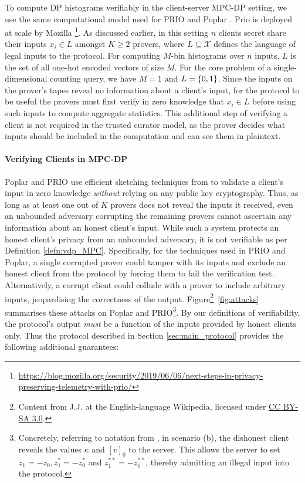 To compute DP histograms verifiably in the client-server MPC-DP setting, we use the same computational model used for PRIO \cite{corrigan-gibbs_prio_2017} and Poplar \cite{boneh_lightweight_2022}. Prio is deployed at scale by Mozilla \footnote{\url{https://blog.mozilla.org/security/2019/06/06/next-steps-in-privacy-preserving-telemetry-with-prio/}}.
As discussed earlier, in this setting $n$ clients secret share their inputs $x_i \in L$ amongst $K \geq 2$ provers, where $L \subseteq \mathcal{X}$ defines the language of legal inputs to the protocol. 
For computing $M$-bin histograms over $n$ inputs, $L$ is the set of all one-hot encoded vectors of size $M$. 
For the core problem of a single-dimensional counting query, we have $M=1$ and $L=\{ 0, 1\}$.  
Since the inputs on the prover's tapes reveal no information about a client's input, for the protocol to be useful the provers must first verify in zero knowledge that $x_i \in L$ before using such inputs to compute aggregate statistics. 
This additional step of verifying a client is not required in the trusted curator model, as the prover decides what inputs should be included in the computation and can see them in plaintext.

\paragraph{Verifying Clients in MPC-DP}
\label{sec:client_verification}

Poplar and PRIO use efficient sketching techniques from \cite{boyle_function_2016} to validate a client's input in zero knowledge \textit{without} relying on any public key cryptography. Thus, as long as at least one out of $K$ provers does not reveal the inputs it received, even an unbounded adversary corrupting the remaining provers cannot ascertain any information about an honest client's input. While such a system protects an honest client's privacy from an unbounded adversary, it is not verifiable as per Definition \ref{defn:vdp_MPC}. 
Specifically, for the techniques used in PRIO and Poplar, a single corrupted prover could tamper with its inputs and exclude an honest client from the protocol by forcing them to fail the verification test. 
Alternatively, a corrupt client could collude with a prover to include arbitrary inputs, jeopardising the correctness of the output. 
Figure\footnote{Content from J.J. at the English-language Wikipedia, licensed under \href{https://creativecommons.org/licenses/by-sa/3.0/deed.en}{CC BY-SA 3.0}.}~\ref{fig:attacks} summarises these attacks on Poplar and PRIO\footnote{Concretely, referring to  notation from \cite[Appendix C]{boneh_lightweight_2022}, in scenario (b), the dishonest client reveals the values $\kappa$ and $[v]_0$ to the server. This allows the server to set $z_1 = -z_0, z_1^* = -z_0^*$ and $z_1^{**} = -z_0^{**}$, thereby 
 admitting an illegal input into the protocol.}. By our definitions of verifiability, the protocol's output \textit{must} be a function of the inputs provided by honest clients only. 
 Thus the protocol described in Section \ref{sec:main_protocol} provides the following additional guarantees:


